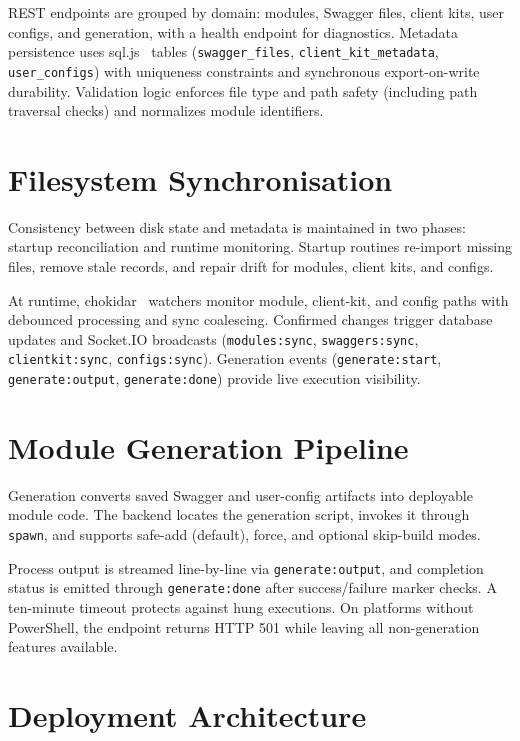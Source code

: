 REST endpoints are grouped by domain: modules, Swagger files, client kits, user configs, and generation, with a health endpoint for diagnostics. Metadata persistence uses sql.js~\cite{sqljs_docs} tables (\texttt{swagger\_files}, \texttt{client\_kit\_metadata}, \texttt{user\_configs}) with uniqueness constraints and synchronous export-on-write durability. Validation logic enforces file type and path safety (including path traversal checks) and normalizes module identifiers.

\section{Filesystem Synchronisation}

Consistency between disk state and metadata is maintained in two phases: startup reconciliation and runtime monitoring. Startup routines re-import missing files, remove stale records, and repair drift for modules, client kits, and configs.

At runtime, chokidar~\cite{chokidar_docs} watchers monitor module, client-kit, and config paths with debounced processing and sync coalescing. Confirmed changes trigger database updates and Socket.IO broadcasts (\texttt{modules:sync}, \texttt{swaggers:sync}, \texttt{clientkit:sync}, \texttt{configs:sync}). Generation events (\texttt{generate:start}, \texttt{generate:output}, \texttt{generate:done}) provide live execution visibility.

\section{Module Generation Pipeline}

Generation converts saved Swagger and user-config artifacts into deployable module code. The backend locates the generation script, invokes it through \texttt{spawn}, and supports safe-add (default), force, and optional skip-build modes.

Process output is streamed line-by-line via \texttt{generate:output}, and completion status is emitted through \texttt{generate:done} after success/failure marker checks. A ten-minute timeout protects against hung executions. On platforms without PowerShell, the endpoint returns HTTP 501 while leaving all non-generation features available.

\section{Deployment Architecture}

